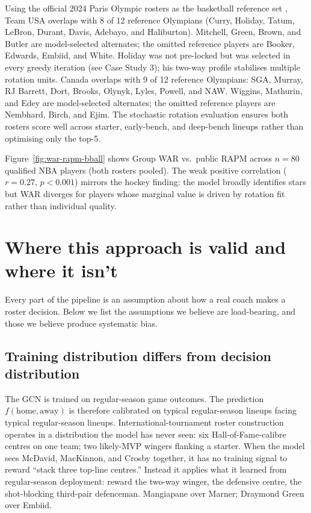 \documentclass[12pt,letterpaper]{article}
\begin{document}
Using the official 2024 Paris Olympic rosters as the basketball
reference set \citep{fibaParisRosterTracker,usaBasketball2024,teamCanada2024MBB},
Team USA overlaps with 8 of 12 reference Olympians
(Curry, Holiday, Tatum, LeBron, Durant, Davis, Adebayo, and Haliburton).
Mitchell, Green, Brown, and Butler are model-selected alternates; the
omitted reference players are Booker, Edwards, Embiid, and White.
Holiday was not pre-locked but was selected in every greedy iteration
(see Case Study 3); his two-way profile stabilises multiple rotation
units.
Canada overlaps with 9 of 12 reference Olympians: SGA, Murray, RJ
Barrett, Dort, Brooks, Olynyk, Lyles, Powell, and NAW.
Wiggins, Mathurin, and Edey are model-selected alternates; the omitted
reference players are Nembhard, Birch, and Ejim.
The stochastic rotation evaluation ensures both rosters score well
across starter, early-bench, and deep-bench lineups rather than
optimising only the top-5.

Figure~\ref{fig:war-rapm-bball} shows Group WAR vs.\ public RAPM
across $n = 80$ qualified NBA players (both rosters pooled).
The weak positive correlation ($r = 0.27$, $p < 0.001$) mirrors the
hockey finding: the model broadly identifies stars but WAR diverges
for players whose marginal value is driven by rotation fit rather than
individual quality.

\section{Where this approach is valid and where it isn't}
\label{sec:critique}

Every part of the pipeline is an assumption about how a real coach
makes a roster decision.
Below we list the assumptions we believe are load-bearing, and those
we believe produce systematic bias.

\subsection{Training distribution differs from decision distribution}
\label{sec:chemistry}

The GCN is trained on regular-season game outcomes.
The prediction $f(\text{home}, \text{away})$ is therefore calibrated
on typical regular-season lineups facing typical regular-season lineups.
International-tournament roster construction operates in a distribution
the model has never seen: six Hall-of-Fame-calibre centres on one team;
two likely-MVP wingers flanking a starter.
When the model sees McDavid, MacKinnon, and Crosby together, it has no
training signal to reward ``stack three top-line centres.''
Instead it applies what it learned from regular-season deployment: reward
the two-way winger, the defensive centre, the shot-blocking third-pair
defenceman.
Mangiapane over Marner; Draymond Green over Embiid.
\end{document}
